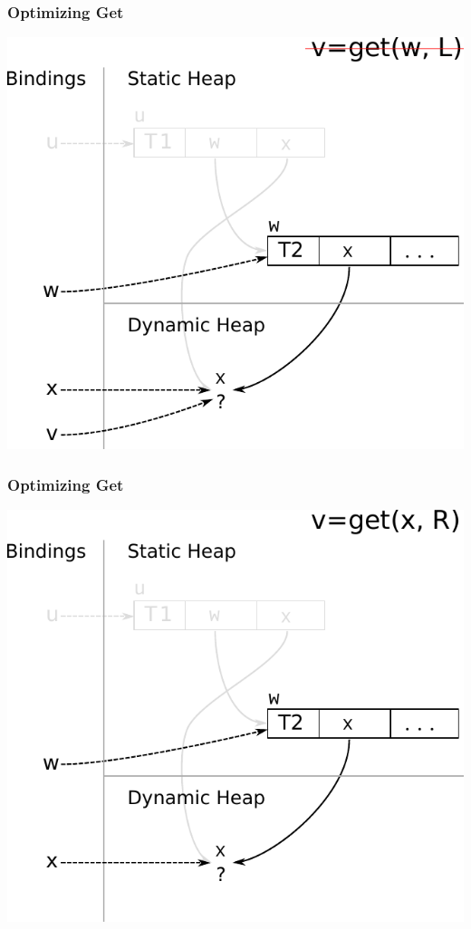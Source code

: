 \documentclass[utf8x]{beamer}
\begin{document}
\begin{frame}[plain]
  \frametitle{Optimizing Get}
  \includegraphics[scale=0.8]{figures/opt_get2}
\end{frame}

\begin{frame}[plain]
  \frametitle{Optimizing Get}
  \includegraphics[scale=0.8]{figures/opt_get3}
\end{frame}
\end{document}

